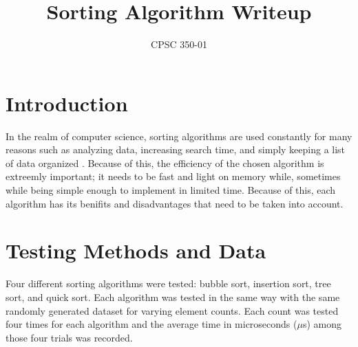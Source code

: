 \documentclass[conference]{IEEEtran}
\begin{document}
\title{Sorting Algorithm Writeup\\
}

\author{
CPSC 350-01
}

\maketitle


\section{Introduction}
In the realm of computer science, sorting algorithms are used constantly for many reasons such as analyzing data, increasing search time, and simply keeping a list of data organized \cite{b1}. Because of this, the efficiency of the chosen algorithm is extreemly important; it needs to be fast and light on memory while, sometimes while being simple enough to implement in limited time. Because of this, each algorithm has its benifits and disadvantages that need to be taken into account. 

\section{Testing Methods and Data}
Four different sorting algorithms were tested: bubble sort, insertion sort, tree sort, and quick sort. Each algorithm was tested in the same way with the same randomly generated dataset for varying element counts. Each count was tested four times for each algorithm and the average time in microseconds ($\mu$s) among those four trials was recorded.
\end{document}
